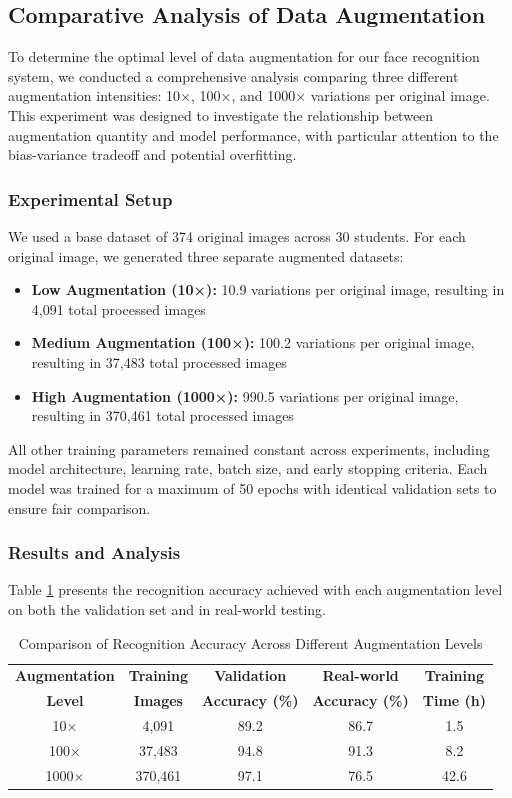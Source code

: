 \documentclass[conference]{IEEEtran}
\begin{document}
\subsection{Comparative Analysis of Data Augmentation}
To determine the optimal level of data augmentation for our face recognition system, we conducted a comprehensive analysis comparing three different augmentation intensities: 10×, 100×, and 1000× variations per original image. This experiment was designed to investigate the relationship between augmentation quantity and model performance, with particular attention to the bias-variance tradeoff and potential overfitting.

\subsubsection{Experimental Setup}
We used a base dataset of 374 original images across 30 students. For each original image, we generated three separate augmented datasets:
\begin{itemize}
\item \textbf{Low Augmentation (10×):} 10.9 variations per original image, resulting in 4,091 total processed images
\item \textbf{Medium Augmentation (100×):} 100.2 variations per original image, resulting in 37,483 total processed images
\item \textbf{High Augmentation (1000×):} 990.5 variations per original image, resulting in 370,461 total processed images
\end{itemize}

All other training parameters remained constant across experiments, including model architecture, learning rate, batch size, and early stopping criteria. Each model was trained for a maximum of 50 epochs with identical validation sets to ensure fair comparison.

\subsubsection{Results and Analysis}
Table \ref{tab:augmentation_comparison} presents the recognition accuracy achieved with each augmentation level on both the validation set and in real-world testing.

\begin{table}[h]
\centering
\caption{Comparison of Recognition Accuracy Across Different Augmentation Levels}
\label{tab:augmentation_comparison}
\begin{tabular}{|c|c|c|c|c|}
\hline
\textbf{Augmentation} & \textbf{Training} & \textbf{Validation} & \textbf{Real-world} & \textbf{Training} \\
\textbf{Level} & \textbf{Images} & \textbf{Accuracy (\%)} & \textbf{Accuracy (\%)} & \textbf{Time (h)} \\ \hline
10× & 4,091 & 89.2 & 86.7 & 1.5 \\ \hline
100× & 37,483 & 94.8 & 91.3 & 8.2 \\ \hline
1000× & 370,461 & 97.1 & 76.5 & 42.6 \\ \hline
\end{tabular}
\end{table}
\end{document}
